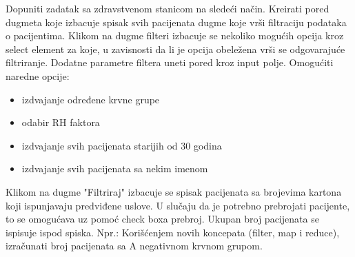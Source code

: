 \begin{primer}
Dopuniti zadatak sa zdravstvenom stanicom na sledeći način. 
Kreirati pored dugmeta koje izbacuje spisak svih pacijenata dugme koje vrši filtraciju podataka o pacijentima.
Klikom na dugme filteri izbacuje se nekoliko mogućih opcija kroz select element za koje, u zavisnosti da li je opcija obeležena vrši se odgovarajuće filtriranje.
Dodatne parametre filtera uneti pored kroz input polje.
Omogućiti naredne opcije:
\begin{itemize}
\item izdvajanje određene krvne grupe
\item odabir RH faktora
\item izdvajanje svih pacijenata starijih od 30 godina
\item izdvajanje svih pacijenata sa nekim imenom 
\end{itemize}
Klikom na dugme "Filtriraj" izbacuje se spisak pacijenata sa brojevima kartona koji ispunjavaju predviđene uslove. 
U slučaju da je potrebno prebrojati pacijente, to se omogućava uz pomoć check boxa prebroj. Ukupan broj pacijenata se ispisuje ispod spiska.
Npr.: Korišćenjem novih koncepata (filter, map i reduce), izračunati broj pacijenata sa A negativnom krvnom grupom.
\end{primer}
\newpage




